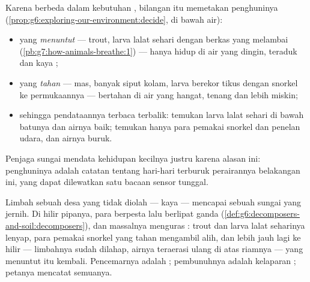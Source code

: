 \begin{proposition}\label{prop:g7:oxygen-in-the-water:map}
Karena  berbeda dalam kebutuhan , bilangan 
itu memetakan penghuninya
(\cref{prop:g6:exploring-our-environment:decide}, di bawah air):
\begin{itemize}
  \item {} yang \emph{menuntut} ---  trout, larva lalat
        sehari dengan berkas  yang melambai
        (\cref{pb:g7:how-animals-breathe:1}) --- hanya hidup di air
        yang dingin, teraduk dan kaya ;
  \item {} yang \emph{tahan} ---  mas, banyak siput kolam,
        larva berekor tikus dengan snorkel ke permukaannya ---
        bertahan di air yang hangat, tenang dan lebih miskin;
  \item sehingga pendataannya terbaca terbalik: temukan larva lalat
        sehari di bawah batunya dan airnya baik; temukan hanya para
        pemakai snorkel dan penelan udara, dan airnya buruk.
\end{itemize}
Penjaga sungai mendata kehidupan kecilnya justru karena alasan ini:
penghuninya adalah catatan tentang hari-hari terburuk perairannya
belakangan ini, yang dapat dilewatkan satu bacaan sensor tunggal.
\end{proposition}
\admitted

\begin{example}\label{ex:g7:oxygen-in-the-water:waste}
Limbah sebuah desa yang tidak diolah --- kaya  ---
mencapai sebuah sungai yang jernih. Di hilir pipanya, para 
berpesta lalu berlipat ganda
(\cref{def:g6:decomposers-and-soil:decomposers}), dan 
massalnya menguras :  trout dan larva lalat seharinya
lenyap, para pemakai snorkel yang tahan mengambil alih, dan lebih jauh
lagi ke hilir --- limbahnya sudah dilahap, airnya teraerasi ulang di
atas riamnya ---  yang menuntut itu kembali. Pencemarnya adalah
; pembunuhnya adalah kelaparan ; petanya mencatat
semuanya.
\end{example}

